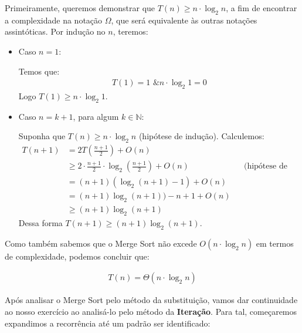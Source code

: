 Primeiramente, queremos demonstrar que $T(n) \geq n \cdot \log_2 n$, a fim de encontrar a complexidade na notação $\Omega$, que será equivalente às outras notações assintóticas. Por indução no $n$, teremos:


\begin{itemize}
	\item Caso $n = 1$:
	      \begin{adjustwidth}{1em}{}
		      Temos que:
		      \begin{align*}
			      T(1) = 1 \text{ \& } n \cdot \log_2 1 = 0
		      \end{align*}
		      Logo $T(1) \geq n \cdot \log_2 1$.
	      \end{adjustwidth}
	\item Caso $n = k + 1$, para algum $k \in \mathbb{N}$:
	      \begin{adjustwidth}{1em}{}
		      Suponha que $T(n) \geq n \cdot \log_2 n$ (hipótese de indução). Calculemos:
		      \begin{align*}
			      T(n + 1) & = 2T\left(\frac{n + 1}{2}\right) + O(n)                                                                                            \\
			               & \geq 2 \cdot \frac{n + 1}{2} \cdot \log_2 \left(\frac{n + 1}{2}\right) + O(n) &  & \text{(hipótese de indução e função crescente)} \\
			               & = (n + 1)(\log_2 (n + 1) - 1) + O(n)                                                                                               \\
			               & = (n + 1)\log_2 (n + 1)) - n + 1 + O(n)                                                                                            \\
			               & \geq (n + 1)\log_2 (n + 1)
		      \end{align*}
		      Dessa forma $T(n + 1) \geq (n + 1)\log_2 (n + 1)$.
	      \end{adjustwidth}
\end{itemize}

Como também sabemos que o Merge Sort não excede $O(n \cdot \log_2 n)$ em termos de complexidade, podemos concluir que:

\begin{align*}
  T(n) = \Theta(n \cdot \log_2 n)
\end{align*}

Após analisar o Merge Sort pelo método da substituição, vamos dar continuidade ao nosso exercício ao analisá-lo pelo método da \textbf{Iteração}. Para tal, começaremos expandimos a recorrência até um padrão ser identificado:

